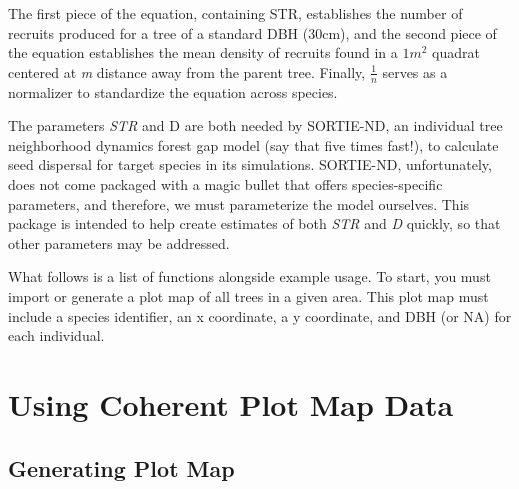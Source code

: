 \documentclass{report}
\begin{document}
The first piece of the equation, containing STR, establishes the number of recruits produced for a tree of a standard DBH (30cm), and the second piece of the equation establishes the mean density of recruits found in a $1 m^2$ quadrat centered at \textit{m} distance away from the parent tree. Finally, $\frac{1}{n}$ serves as a normalizer to standardize the equation across species.

The parameters \textit{STR} and {D} are both needed by SORTIE-ND, an individual tree neighborhood dynamics forest gap model (say that five times fast!), to calculate seed dispersal for target species in its simulations. SORTIE-ND, unfortunately, does not come packaged with a magic bullet that offers species-specific parameters, and therefore, we must parameterize the model ourselves. This package is intended to help create estimates of both \textit{STR} and \textit{D} quickly, so that other parameters may be addressed.

What follows is a list of functions alongside example usage. To start, you must import or generate a plot map of all trees in a given area. This plot map must include a species identifier, an x coordinate, a y coordinate, and DBH (or NA) for each individual.

\chapter{Using Coherent Plot Map Data}

\section{Generating Plot Map}
\end{document}
